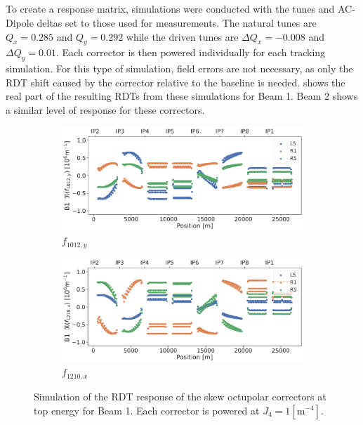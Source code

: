 \subsection{}

To create a response matrix, simulations were conducted with the tunes and AC-Dipole deltas set to
those used for measurements. The natural tunes are $Q_x = 0.285$ and $Q_y = 0.292$ while the driven
tunes are $\Delta Q_x = -0.008$ and $\Delta Q_y = 0.01$.  Each corrector is then powered
individually for each tracking simulation. For this type of simulation, field errors are not
necessary, as only the RDT shift caused by the corrector relative to the baseline is needed.
 shows the real part of the resulting RDTs from these
simulations for Beam 1. Beam 2 shows a similar level of response for these correctors.

\begin{figure}[!htb]
    \centering
    \begin{subfigure}{0.8\textwidth}
        \includegraphics[width=\textwidth]{./images/f1012_b1_correctors.pdf}
        \caption{$f_{1012,y}$}
    \end{subfigure}
    \par\bigskip 
    \begin{subfigure}{0.8\textwidth}
        \includegraphics[width=\textwidth]{./images/f1210_b1_correctors.pdf}
        \caption{$f_{1210,x}$}
    \end{subfigure}
    \caption{Simulation of the RDT response of the skew octupolar correctors at top energy for Beam
    1. Each corrector is powered at $J_4 = 1 [\text{m}^{-4}]$.}
    \label{fig:skew_octupolar:response_correctors}
\end{figure}



